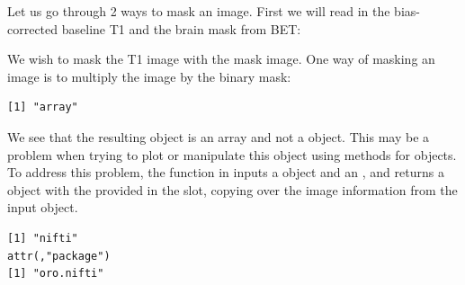 Let us go through 2 ways to mask an image.  First we will read in the bias-corrected baseline T1 and the brain mask from BET:


\begin{knitrout}
\color{fgcolor}\begin{kframe}
\begin{alltt}
 \hlkwb{=} \hlstd{(}\hlstd{,} \hlstd{=}\hlstd{)}
 \hlkwb{=} \hlstd{(}\hlstd{,} \hlstd{=}\hlstd{)}
\end{alltt}
\end{kframe}
\end{knitrout}

We wish to mask the T1 image with the mask image.  One way of masking an image is to multiply the image by the binary mask:
\begin{knitrout}
\color{fgcolor}\begin{kframe}
\begin{alltt}
 \hlkwb{=}  \hlopt{*} 
\end{alltt}
\begin{verbatim}
[1] "array"
\end{verbatim}
\end{kframe}
\end{knitrout}

We see that the resulting object is an array and not a  object. This may be a problem when trying to plot or manipulate this object using methods for  objects.  To address this problem, the  function in  inputs a  object and an , and returns a  object with the provided  in the  slot, copying over the image information from the input  object.  

\begin{knitrout}
\color{fgcolor}\begin{kframe}
\begin{alltt}
 \hlkwb{=} 
\end{alltt}
\begin{verbatim}
[1] "nifti"
attr(,"package")
[1] "oro.nifti"
\end{verbatim}
\end{kframe}
\end{knitrout}

